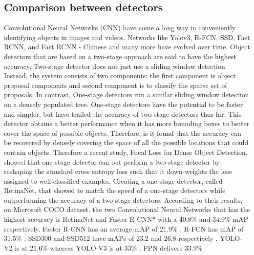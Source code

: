 \documentclass[sigconf, nonacm]{acmart}
\begin{document}
\subsection{ Comparison between detectors}
Convolutional Neural Networks (CNN) have come a long way in conveniently identifying objects in images and videos. Networks like Yolov3, R-FCN, SSD, Fast RCNN, and Fast RCNN - Chinese and many more have evolved over time. Object detectors that are based on a two-stage approach are said to have the highest accuracy. Two-stage detector does not just use a sliding window detection. Instead, the system consists of two components: the first component  is object proposal components and second component is to classify the sparse set of proposals. In contrast, One-stage detectors  run a similar sliding window detection on a densely populated tree. One-stage detectors have the potential to be faster and simpler, but have trailed the accuracy of two-stage detectors thus far. This detector obtains a better performance when it has more bounding boxes to better cover the space of possible objects. Therefore, is it found that the accuracy can be recovered by densely covering the space of all the possible locations that could contain objects. Therefore a recent study, Focal Loss for Dense Object Detection, showed that one-stage detector can out perform a two-stage detector by reshaping the standard cross entropy loss such that it down-weights the loss assigned to well-classified examples. Creating a one-stage detector, called RetinaNet\cite{Abril01}, that showed to match the speed of a one-stage detectors while outperforming the accuracy of a two-stage detectors.
According to their results, on Microsoft COCO dataset, the two Convolutional Neural Networks that has the highest accuracy is RetinaNet and Faster R-CNN* with a 40.8\% and 34.9\% mAP respectively. Faster R-CNN has an average mAP of 21.9\% . R-FCN has mAP of 31.5\% . SSD300 and SSD512 have mAPs of 23.2 and 26.8 respectively . YOLO-V2 is at 21.6\% whereas YOLO-V3 is at 33\% . FPN delivers 33.9\% 
\end{document}
